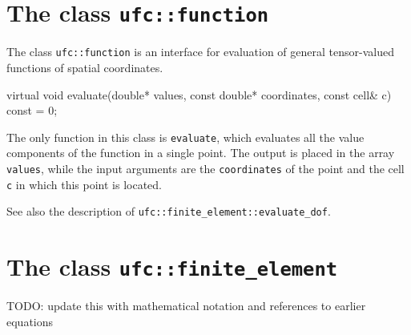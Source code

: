 \section{The class \texttt{ufc::function}}







The class \texttt{ufc::function} is an interface for evaluation of
general tensor-valued functions of spatial coordinates.

\begin{code}
virtual void evaluate(double* values,
                      const double* coordinates,
                      const cell& c) const = 0;
\end{code}

The only function in this class is \texttt{evaluate},
which evaluates all the value components of the function in a single point.
The output is placed in the array \texttt{values},
while the input arguments are the \texttt{coordinates} of the point
and the cell \texttt{c} in which this point is located.

See also the description of \texttt{ufc::finite\_element::evaluate\_dof}.


\section{The class \texttt{ufc::finite\_element}}

TODO: update this with mathematical notation and references to earlier equations






